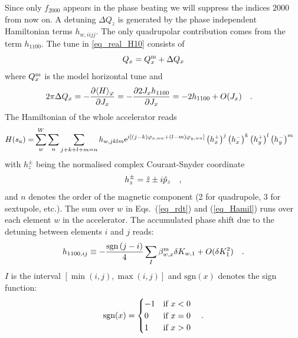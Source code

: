 Since only $f_{2000}$ appears in the phase beating we will suppress the indices $2000$ from now on.
A detuning $\Delta Q_z$ is generated by the phase independent Hamiltonian terms $h_{w, iijj}$.
The only quadrupolar contribution comes from the term
$h_{1100}$.
The tune in \eqref{eq_real_H10} consists of
\begin{equation}
  \label{eq_tune_dshift}
  Q_x = Q_{x}^\text{m} + \Delta Q_x
\end{equation}
where $Q_{x}^\text{m}$ is the model horizontal tune and
\begin{align}
  2\pi\Delta Q_x &= -\frac{\partial \langle H \rangle_\varphi}{\partial J_x}
  = -\frac{\partial 2 J_x
    h_{1100}}{\partial J_x} = -2h_{1100} + O(J_x) 
    \quad . 
  \label{eq_tune_shift_h1100}
\end{align}
The Hamiltonian of the whole accelerator reads
\begin{align}
  H(s_a) =& \sum\limits_{w}^{W}\sum\limits_{n}\sum\limits_{j+k+l+m=n} h_{w,jklm}
  \text{e}^{i\left[ (j-k)\varphi_{x,wa} + (l-m)\varphi_{y,wa} \right]}
  \left( h_x^+ \right)^j
  \left( h_x^- \right)^k
  \left( h_y^+ \right)^l
  \left( h_y^- \right)^m
  \label{eq_Hamil}
\end{align}
with $h_z^\pm$ being the normalised complex Courant-Snyder coordinate
\begin{equation}
  h_z^\pm = \hat{z} \pm i \hat{p}_z
    \quad ,
    \label{eq_courantsnyder}
\end{equation}
and $n$ denotes the order of the magnetic component (2 for quadrupole, 3 for sextupole,
etc.).
The sum over $w$ in Eqs.~(\ref{eq_rdt}) and (\ref{eq_Hamil}) runs over each element $w$ in the accelerator.
The accumulated phase shift due to the detuning between elements $i$ and
$j$ reads:
\begin{equation}
  h_{1100,ij} \equiv -\frac{\text{sgn}\left( j - i \right)}{4}\sum\limits_{I}\beta_{w,x}^\text{m} \delta K_{w,1} + O(\delta
  K_1^2)\quad .
  \label{eq_h11000-j}
\end{equation}
$I$ is the interval $[\min(i,j), \max (i,j)]$ and $\text{sgn}(x)$ denotes the sign function:
\begin{equation}
    \text{sgn}(x) =
    \begin{cases}
        -1 & \text{if } x<0\\
        0 &\text{if } x=0\\
        1 &\text{if } x >0
    \end{cases}
    \quad .
    \label{eq_def_sgn_fun}
\end{equation}


